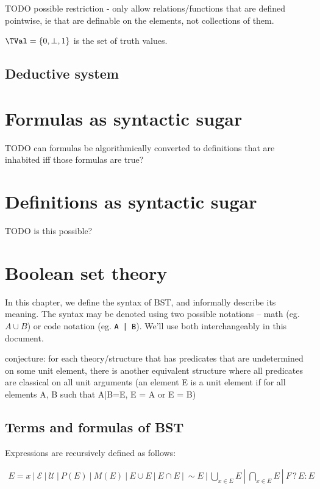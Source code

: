 \documentclass[oneside,12pt]{book}
\theoremstyle{definition}
\theoremstyle{remark}
\newcommand{\ct}{{\sim}} %
\newcommand{\pSet}{P}
\newcommand{\mSet}{M}
\newcommand{\conditional}[3]{#1 \mathrel{?} #2 : #3}
\newcommand{\Empty}{\mathcal{E}}
\newcommand{\Universal}{\mathcal{U}}
\begin{document}
TODO possible restriction - only allow relations/functions that are defined pointwise,
ie that are definable on the elements, not collections of them.

\begin{defBox}
  $\TVal = \{ 0, \bot, 1 \}$ is the set of truth values.
\end{defBox}

\section{Deductive system}


\chapter{Formulas as syntactic sugar}
TODO can formulas be algorithmically converted to definitions that are inhabited
iff those formulas are true?


\chapter{Definitions as syntactic sugar}
TODO is this possible?


\chapter{Boolean set theory}
In this chapter, we define the syntax of BST, and informally describe its meaning.
The syntax may be denoted using two possible notations -- math (eg. $A \cup B$)
or code notation (eg. \texttt{A | B}). We'll use both interchangeably in this document.

conjecture: for each theory/structure that has predicates that are undetermined
on some unit element, there is another equivalent structure where all predicates
are classical on all unit arguments (an element E is a unit element if for all
elements A, B such that A|B=E, E = A or E = B)

\section{Terms and formulas of BST}
Expressions are recursively defined as follows:

\begin{align*}
  E = x~|~\Empty~|~\Universal~|~\pSet(E)~|~\mSet(E)~|~E \cup E~|~E \cap E~|~\ct E%
  ~|~\bigcup_{x \in E}E~|~\bigcap_{x \in E}E~|~\conditional{F}{E}{E}
\end{align*}
\end{document}
